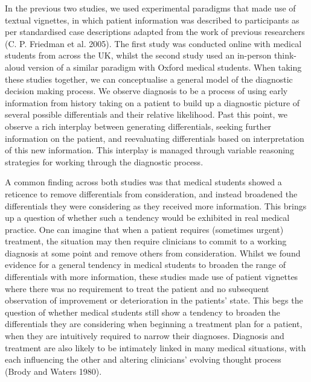\documentclass[a4paper, nobind]{templates/ociamthesis}
\begin{document}
In the previous two studies, we used experimental paradigms that made use of textual vignettes, in which patient information was described to participants as per standardised case descriptions adapted from the work of previous researchers (C. P. Friedman et al. 2005). The first study was conducted online with medical students from across the UK, whilst the second study used an in-person think-aloud version of a similar paradigm with Oxford medical students. When taking these studies together, we can conceptualise a general model of the diagnostic decision making process. We observe diagnosis to be a process of using early information from history taking on a patient to build up a diagnostic picture of several possible differentials and their relative likelihood. Past this point, we observe a rich interplay between generating differentials, seeking further information on the patient, and reevaluating differentials based on interpretation of this new information. This interplay is managed through variable reasoning strategies for working through the diagnostic process.

\hfill\break
A common finding across both studies was that medical students showed a reticence to remove differentials from consideration, and instead broadened the differentials they were considering as they received more information. This brings up a question of whether such a tendency would be exhibited in real medical practice. One can imagine that when a patient requires (sometimes urgent) treatment, the situation may then require clinicians to commit to a working diagnosis at some point and remove others from consideration. Whilst we found evidence for a general tendency in medical students to broaden the range of differentials with more information, these studies made use of patient vignettes where there was no requirement to treat the patient and no subsequent observation of improvement or deterioration in the patients' state. This begs the question of whether medical students still show a tendency to broaden the differentials they are considering when beginning a treatment plan for a patient, when they are intuitively required to narrow their diagnoses. Diagnosis and treatment are also likely to be intimately linked in many medical situations, with each influencing the other and altering clinicians' evolving thought process (Brody and Waters 1980).
\end{document}
